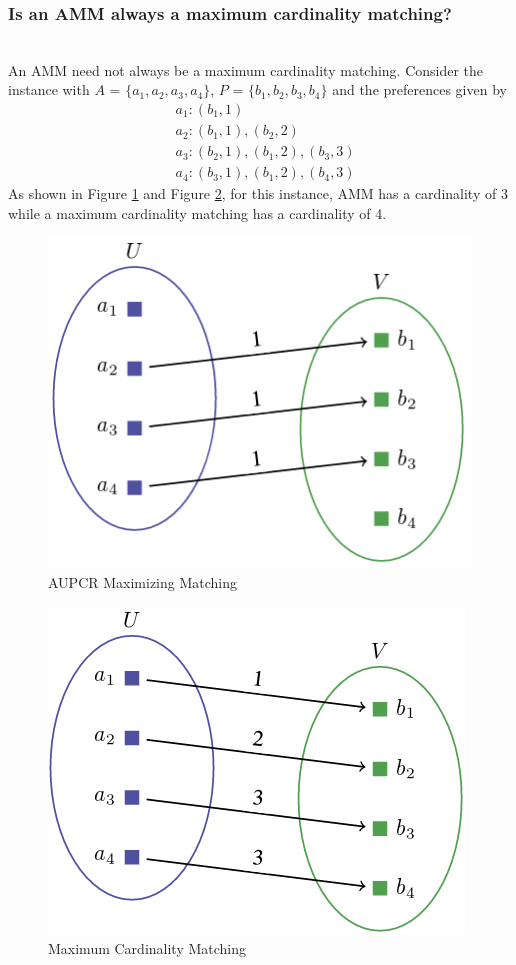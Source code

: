 \documentclass[letterpaper]{article} %
\begin{document}
\subsubsection{Is an AMM always a maximum cardinality matching?} ~ \\
An AMM need not always be a maximum cardinality matching. Consider the instance with $A$  = $\{a_1, a_2, a_3, a_4\}$, $P$  = $\{b_1, b_2, b_3, b_4\}$ and the preferences given by
\begin{align*}
&a_1 : (b_1, 1) \\
&a_2 : (b_1,1), (b_2,2) \\
&a_3 : (b_2,1), (b_1,2), (b_3,3) \\
&a_4 : (b_3,1), (b_1,2), (b_4,3)
\end{align*}
As shown in Figure \ref{AMM_1} and Figure \ref{MM_1}, for this instance, AMM has a cardinality of 3 while a maximum cardinality matching has a cardinality of 4.
\begin{figure}[h]
	\centering
	\includegraphics[scale=0.35]{AMM_1.png}
    \caption{AUPCR Maximizing Matching}
    \label{AMM_1}
\end{figure}
\begin{figure}[h]
	\centering
	\includegraphics[scale=0.35]{MM_1.png}
    \caption{Maximum Cardinality Matching}
    \label{MM_1}
\end{figure}
\end{document}
